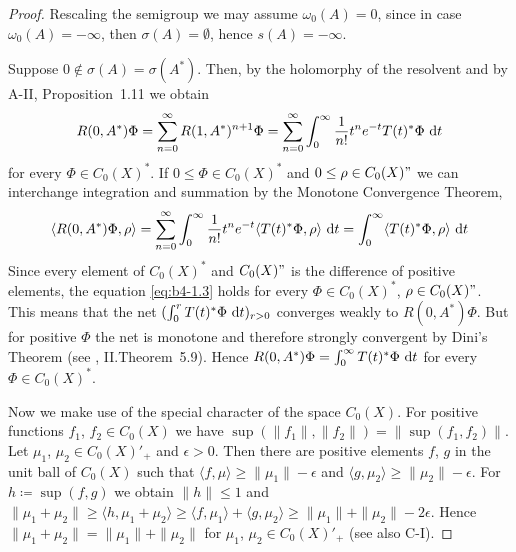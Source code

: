 \begin{proof}
Rescaling the semigroup we may assume $\omega_{0}(A) = 0$, 
since in case $\omega_{0}(A) = -\infty$, then $\sigma(A) = \emptyset$, hence $s(A) = -\infty$.

Suppose $0 \notin \sigma(A) = \sigma(A^*)$. 
Then, by the holomorphy of the resolvent and by A-II, Proposition~1.11 we obtain
\[
   R(0,A^*)\Phi = \sum_{n=0}^{\infty} R(1,A^*)^{n+1}\Phi = \sum_{n=0}^{\infty} \int_0^{\infty} \frac{1}{n!} t^n e^{-t}T(t)^*\Phi \, \mathop{}\!\mathrm{d}{t}
\]  
 for every  $\Phi \in C_{0}(X)^*$. 
 If $0 \leq \Phi \in C_{0}(X)^*$ and $0 \leq \rho \in C_{0}(X)"$ we can interchange integration and summation by the Monotone Convergence Theorem, \ie
\begin{equation}\label{eq:b4-1.3}
   \langle R(0,A^*)\Phi,\rho \rangle = \sum_{n=0}^{\infty} \int_0^{\infty} \frac{1}{n!} t^n e^{-t}\langle T(t)^*\Phi,\rho \rangle \, \mathop{}\!\mathrm{d}{t} = \int_0^{\infty} \langle T(t)^*\Phi,\rho \rangle \, \mathop{}\!\mathrm{d}{t}
\end{equation}
Since every element of $C_{0}(X)^*$ and $C_{0}(X)"$ is the difference of positive
elements, the equation \eqref{eq:b4-1.3} holds for every $\Phi \in C_{0}(X)^*$, $\rho \in C_{0}(X)"$. 
This means that the net $(\int_0^r T(t)^*\Phi \, \mathop{}\!\mathrm{d}{t})_{r > 0}$ converges weakly to $R(0,A^*)\Phi$. 
But for positive $\Phi$ the net is monotone and therefore strongly convergent by Dini's Theorem (see \citet{schaefer:1974}, II.Theorem~5.9). 
Hence $R(0,A^*)\Phi = \int_0^{\infty} T(t)^*\Phi \, \mathop{}\!\mathrm{d}{t}$ for every $\Phi \in C_{0}(X)^*$.

Now we make use of the special character of the space $C_{0}(X)$. 
For positive functions $f_1$, $f_2 \in C_{0}(X)$ we have $\sup(\|f_1\|,\|f_2\|) = \|\sup(f_1,f_2)\|$. 
Let $\mu_1$, $\mu_2 \in C_{0}(X)'_+$ and $\epsilon  >  0$. 
Then there are positive elements $f$, $g$ in the unit ball of $C_{0}(X)$ such that $\langle f,\mu \rangle \geq \|\mu_1\| - \epsilon$ and $\langle g,\mu_2 \rangle \geq \|\mu_2\| - \epsilon$. 
For $h \coloneq \sup(f,g)$ we obtain $\|h\| \leq 1$ and $\|\mu_1 + \mu_2\| \geq \langle h,\mu_1 + \mu_2 \rangle \geq \langle f,\mu_1 \rangle + \langle g,\mu_2 \rangle \geq \|\mu_1\| + \|\mu_2\| - 2\epsilon$.
Hence $\|\mu_1 + \mu_2\| = \|\mu_1\| + \|\mu_2\|$ for $\mu_1$, $\mu_2 \in C_{0}(X)'_+$ (see also C-I).


\end{proof}
